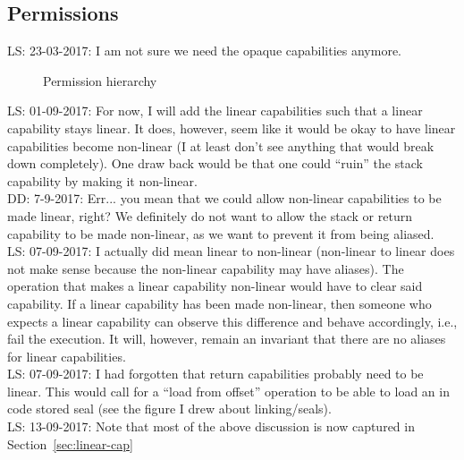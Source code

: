 \documentclass[a4paper]{article}
\newcommand\lau[1]{{\color{purple} \sf \footnotesize {LS: #1}}\\}
\newcommand\dominique[1]{{\color{purple} \sf \footnotesize {DD: #1}}\\}
\newcommand{\plainperm}[1]{\textsc{#1}}
\newcommand{\rwx}{\plainperm{rwx}}
\newcommand{\rx}{\plainperm{rx}}
\newcommand{\rw}{\plainperm{rw}}
\newcommand{\readonly}{\plainperm{r}}
\newcommand{\noperm}{\plainperm{0}}
\newcommand{\enter}{\plainperm{e}}
\begin{document}
\subsection{Permissions}
\lau{23-03-2017: I am not sure we need the opaque capabilities anymore.} %
\begin{figure}[!h]
  \centering

  \caption{Permission hierarchy}
  \label{fig:perm-hier}
\end{figure}
\lau{01-09-2017: For now, I will add the linear capabilities such that a linear capability stays linear. It does, however, seem like it would be okay to have linear capabilities become non-linear (I at least don't see anything that would break down completely). One draw back would be that one could ``ruin'' the stack capability by making it non-linear.}
\dominique{7-9-2017: Err... you mean that we could allow non-linear capabilities to be made linear, right?  We definitely do not want to allow the stack or return capability to be made non-linear, as we want to prevent it from being aliased.}
\lau{07-09-2017: I actually did mean linear to non-linear (non-linear to linear does not make sense because the non-linear capability may have aliases). The operation that makes a linear capability non-linear would have to clear said capability. If a linear capability has been made non-linear, then someone who expects a linear capability can observe this difference and behave accordingly, i.e., fail the execution. It will, however, remain an invariant that there are no aliases for linear capabilities.}
\lau{07-09-2017: I had forgotten that return capabilities probably need to be linear. This would call for a ``load from offset'' operation to be able to load an in code stored seal (see the figure I drew about linking/seals).}
\lau{13-09-2017: Note that most of the above discussion is now captured in Section~\ref{sec:linear-cap}}
\end{document}
